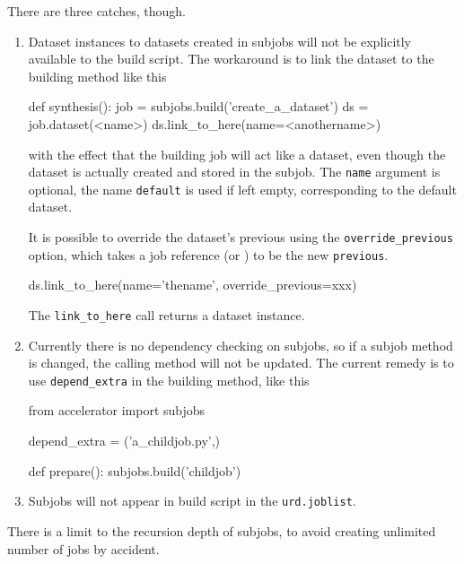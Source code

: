 There are three catches, though.
\begin{enumerate}
\item
Dataset instances to datasets created in subjobs will not be
explicitly available to the build script.  The workaround is to link
the dataset to the building method like this
\begin{python}
def synthesis():
    job = subjobs.build('create_a_dataset')
    ds = job.dataset(<name>)
    ds.link_to_here(name=<anothername>)
\end{python}
with the effect that the building job will act like a dataset, even
though the dataset is actually created and stored in the subjob.  The
\texttt{name} argument is optional, the name \texttt{default} is used
if left empty, corresponding to the default dataset.

It is possible to override the dataset's previous using the
\texttt{override\_previous} option, which takes a job reference (or \pyNone)
to be the new \texttt{previous}.  
\begin{python}
    ds.link_to_here(name='thename', override_previous=xxx)
\end{python}
The \texttt{link\_to\_here} call returns a dataset instance.

\item
Currently there is no dependency checking on subjobs, so if a subjob
method is changed, the calling method will not be updated.  The
current remedy is to use \texttt{depend\_extra} in the building
method, like this
\begin{python}
from accelerator import subjobs

depend_extra = ('a_childjob.py',)

def prepare():
    subjobs.build('childjob')
\end{python}

\item
  Subjobs will not appear in build script in the \texttt{urd.joblist}.

\end{enumerate}
There is a limit to the recursion depth of subjobs, to avoid creating
unlimited number of jobs by accident.



